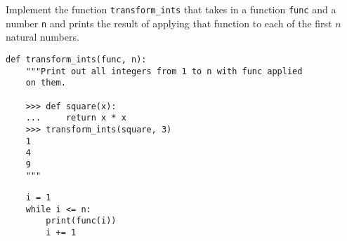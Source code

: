 \question Implement the function \texttt{transform\_ints} that takes in a
function \texttt{func} and a number \texttt{n} and prints the result of applying
that function to each of the first $n$ natural numbers.

\begin{lstlisting}
def transform_ints(func, n):
    """Print out all integers from 1 to n with func applied
    on them.

    >>> def square(x):
    ...     return x * x
    >>> transform_ints(square, 3)
    1
    4
    9
    """
\end{lstlisting}
\begin{solution}[1in]
\begin{lstlisting}
    i = 1
    while i <= n:
        print(func(i))
        i += 1
\end{lstlisting}
\end{solution}
